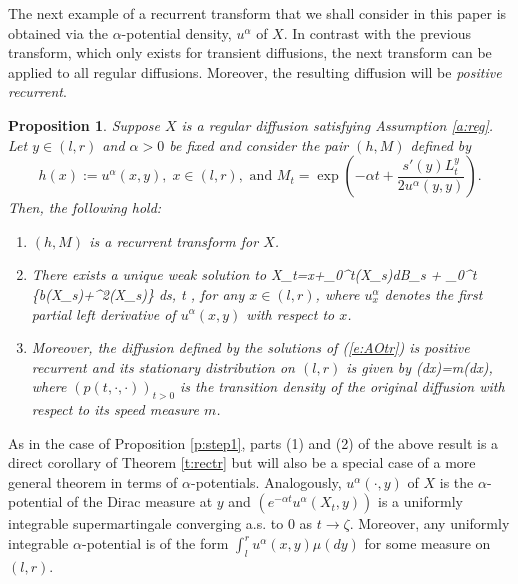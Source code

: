 \documentclass[11pt,reqno]{amsart}
\numberwithin{equation}{section}
\newtheorem{proposition}{Proposition}[section]
\def\rar{\rightarrow}
\begin{document}
The next example of a recurrent transform that we shall consider in this paper is obtained via  the $\alpha$-potential density, $u^{\alpha}$ of $X$. In contrast with the previous transform, which only exists for transient diffusions, the next transform can be applied to all regular diffusions. Moreover, the resulting diffusion  will be {\em positive recurrent}. 
\begin{proposition} \label{p:AOtr} Suppose $X$ is a regular  diffusion satisfying Assumption \ref{a:reg}.  Let $y\in (l,r)$ and $\alpha >0$ be fixed and consider the pair $(h,M)$ defined by
\[
h(x):=u^{\alpha}(x,y), \; x \in (l,r),\mbox{ and } M_t=\exp\left(-\alpha t+ \frac{s'(y)L^y_t}{2u^{\alpha}(y,y)}\right).
\]
Then, the following hold:
\begin{enumerate}
\item $(h,M)$ is a recurrent transform for $X$.
\item There exists a unique weak solution to 
\be \label{e:AOtr}
X_t=x+\int_0^t\sigma(X_s)dB_s + \int_0^t \left\{b(X_s)+\sigma^2(X_s)\right\} ds, \qquad t ,
\ee
for any $x \in (l,r)$, where  $u^{\alpha}_x$ denotes the first partial left derivative of $u^{\alpha}(x,y)$ with respect to $x$. 
\item Moreover, the diffusion defined by the solutions of (\ref{e:AOtr}) is positive recurrent and its stationary distribution on $(l,r)$ is given by
\be \label{e:invdist}
\pi(dx)=m(dx),
\ee
where $(p(t,\cdot,\cdot))_{t >0}$ is the transition density of the original diffusion with respect to its speed measure $m$. 
\end{enumerate}
\end{proposition}
As in the case of Proposition \ref{p:step1}, parts (1) and (2) of the above result is a direct corollary of Theorem \ref{t:rectr} but will also be a special case of a more general theorem in terms of $\alpha$-potentials. Analogously,  $u^{\alpha}(\cdot,y) $ of $X$ is the $\alpha$-potential of the Dirac measure at $y$ and $(e^{-\alpha t}u^{\alpha}(X_t,y))$ is a uniformly integrable supermartingale converging a.s. to $0$ as $t \rar \zeta$.  Moreover,  any uniformly integrable $\alpha$-potential is of the form $\int_l^r u^{\alpha}(x,y)\mu(dy)$ for some measure on $(l,r)$.
\end{document}
